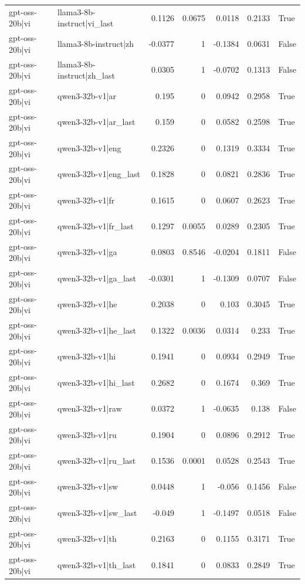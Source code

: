 \begin{table}
\begin{tabular}{l l r r r r l}
gpt-oss-20b|vi & llama3-8b-instruct|vi_last & 0.1126 & 0.0675 & 0.0118 & 0.2133 & True \\
gpt-oss-20b|vi & llama3-8b-instruct|zh & -0.0377 & 1 & -0.1384 & 0.0631 & False \\
gpt-oss-20b|vi & llama3-8b-instruct|zh_last & 0.0305 & 1 & -0.0702 & 0.1313 & False \\
gpt-oss-20b|vi & qwen3-32b-v1|ar & 0.195 & 0 & 0.0942 & 0.2958 & True \\
gpt-oss-20b|vi & qwen3-32b-v1|ar_last & 0.159 & 0 & 0.0582 & 0.2598 & True \\
gpt-oss-20b|vi & qwen3-32b-v1|eng & 0.2326 & 0 & 0.1319 & 0.3334 & True \\
gpt-oss-20b|vi & qwen3-32b-v1|eng_last & 0.1828 & 0 & 0.0821 & 0.2836 & True \\
gpt-oss-20b|vi & qwen3-32b-v1|fr & 0.1615 & 0 & 0.0607 & 0.2623 & True \\
gpt-oss-20b|vi & qwen3-32b-v1|fr_last & 0.1297 & 0.0055 & 0.0289 & 0.2305 & True \\
gpt-oss-20b|vi & qwen3-32b-v1|ga & 0.0803 & 0.8546 & -0.0204 & 0.1811 & False \\
gpt-oss-20b|vi & qwen3-32b-v1|ga_last & -0.0301 & 1 & -0.1309 & 0.0707 & False \\
gpt-oss-20b|vi & qwen3-32b-v1|he & 0.2038 & 0 & 0.103 & 0.3045 & True \\
gpt-oss-20b|vi & qwen3-32b-v1|he_last & 0.1322 & 0.0036 & 0.0314 & 0.233 & True \\
gpt-oss-20b|vi & qwen3-32b-v1|hi & 0.1941 & 0 & 0.0934 & 0.2949 & True \\
gpt-oss-20b|vi & qwen3-32b-v1|hi_last & 0.2682 & 0 & 0.1674 & 0.369 & True \\
gpt-oss-20b|vi & qwen3-32b-v1|raw & 0.0372 & 1 & -0.0635 & 0.138 & False \\
gpt-oss-20b|vi & qwen3-32b-v1|ru & 0.1904 & 0 & 0.0896 & 0.2912 & True \\
gpt-oss-20b|vi & qwen3-32b-v1|ru_last & 0.1536 & 0.0001 & 0.0528 & 0.2543 & True \\
gpt-oss-20b|vi & qwen3-32b-v1|sw & 0.0448 & 1 & -0.056 & 0.1456 & False \\
gpt-oss-20b|vi & qwen3-32b-v1|sw_last & -0.049 & 1 & -0.1497 & 0.0518 & False \\
gpt-oss-20b|vi & qwen3-32b-v1|th & 0.2163 & 0 & 0.1155 & 0.3171 & True \\
gpt-oss-20b|vi & qwen3-32b-v1|th_last & 0.1841 & 0 & 0.0833 & 0.2849 & True \\

\end{tabular}
\end{table}
